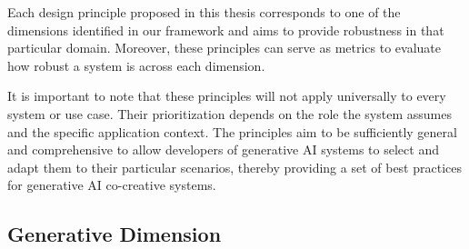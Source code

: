 Each design principle proposed in this thesis corresponds to one of the dimensions identified in our framework and aims to provide robustness in that particular domain. Moreover, these principles can serve as metrics to evaluate how robust a system is across each dimension.

It is important to note that these principles will not apply universally to every system or use case. Their prioritization depends on the role the system assumes and the specific application context. The principles aim to be sufficiently general and comprehensive to allow developers of generative AI systems to select and adapt them to their particular scenarios, thereby providing a set of best practices for generative AI co-creative systems.



\subsection{Generative Dimension}

